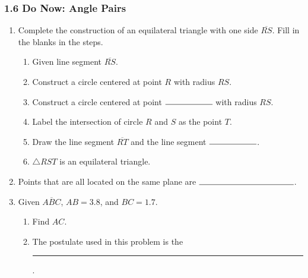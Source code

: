 \documentclass[12pt, twoside]{article}
\begin{document}
\subsubsection*{1.6 Do Now: Angle Pairs}
  \vspace{0.5cm}
  \begin{enumerate}

  \item Complete the construction of an equilateral triangle with one side $\overline{RS}$. Fill in the blanks in the steps.
    \begin{enumerate}
      \item Given line segment $\overline{RS}$.
      \item Construct a circle centered at point $R$ with radius $RS$.  \bigskip
      \item Construct a circle centered at point $\rule{2cm}{0.15mm}$  with radius $RS$. \bigskip
      \item Label the intersection of circle $R$ and $S$ as the point $T$. \bigskip
      \item Draw the line segment $\overline{RT}$ and the line segment  $\rule{2cm}{0.15mm}$.
      \bigskip
      \item $\triangle RST$ is an equilateral triangle.
    \end{enumerate}
    \vspace{8cm}
    \begin{center}
    \end{center}

\newpage
  \item Points that are all located on the same plane are $\rule{4cm}{0.15mm}$. \bigskip

  \item Given $\overline{ABC}$, $AB=3.8$, and $BC=1.7$.
  \begin{enumerate}
    \item Find ${AC}$.\\[1.5cm]
       \vspace{2cm}
    \item The postulate used in this problem is the \rule{6cm}{0.15mm}.
  \end{enumerate}


\end{enumerate}
\end{document}
